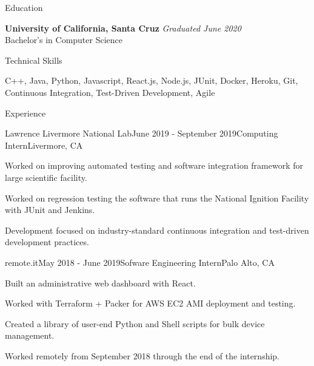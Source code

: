 \documentclass{resume} %
\begin{document}

\begin{rSection}{Education}

    {\bf University of California, Santa Cruz} \hfill {\em Graduated June 2020} \\ 
    Bachelor's in Computer Science

\end{rSection}


\begin{rSection}{Technical Skills}
    \item C++, Java, Python, Javascript, React.js, Node.js, JUnit, Docker, Heroku, Git, Continuous Integration, 
    Test-Driven Development, Agile
\end{rSection}


\begin{rSection}{Experience}
    \begin{rSubsection}{Lawrence Livermore National Lab}{June 2019 - September 2019}{Computing Intern}{Livermore, CA}
        \item Worked on improving automated testing and software integration framework for large scientific facility.
        \item Worked on regression testing the software that runs the National Ignition Facility with JUnit and Jenkins.
        \item Development focused on industry-standard continuous integration and test-driven development practices.
    \end{rSubsection}

    \begin{rSubsection}{remote.it}{May 2018 - June 2019}{Sofware Engineering Intern}{Palo Alto, CA}
        \item Built an administrative web dashboard with React.
        \item Worked with Terraform + Packer for AWS EC2 AMI deployment and testing.
        \item Created a library of user-end Python and Shell scripts for bulk device management.
        \item Worked remotely from September 2018 through the end of the internship.
    \end{rSubsection}

\end{rSection}
\end{document}
